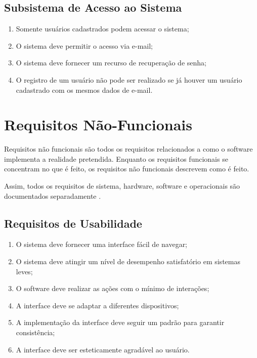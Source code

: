 \subsection{Subsistema de Acesso ao Sistema}
\begin{enumerate}
  \item Somente usuários cadastrados podem acessar o sistema;
  \item O sistema deve permitir o acesso via e-mail;
  \item O sistema deve fornecer um recurso de recuperação de senha;
  \item O registro de um usuário não pode ser realizado se já houver um usuário cadastrado com os mesmos dados de e-mail.

\end{enumerate}





\section{ Requisitos N\~{a}o-Funcionais}

Requisitos não funcionais são todos os requisitos relacionados a como o software implementa a realidade pretendida. Enquanto os requisitos funcionais se concentram no que é feito, os requisitos não funcionais descrevem como é feito.

Assim, todos os requisitos de sistema, hardware, software e operacionais são documentados separadamente \cite{Dennis2014}.
\subsection{Requisitos de Usabilidade }
\begin{enumerate}
  \item O sistema deve fornecer uma interface fácil de navegar;
  \item O sistema deve atingir um nível de desempenho satisfatório em sistemas leves;
  \item O software deve realizar as ações com o mínimo de interações;
  \item A interface deve se adaptar a diferentes dispositivos;
  \item A implementação da interface deve seguir um padrão para garantir consistência;
  \item A interface deve ser esteticamente agradável ao usuário.
\end{enumerate}


